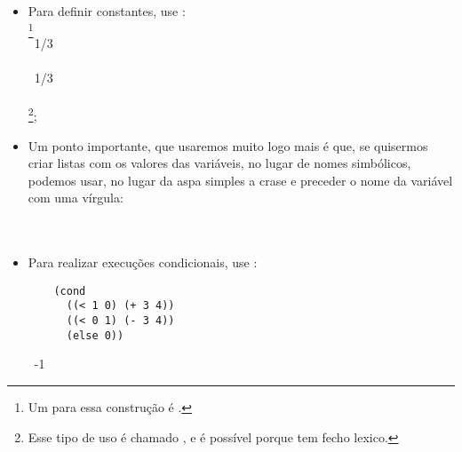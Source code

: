 \documentclass{article}
\begin{document}
\begin{itemize}
{    ter fórmulas crescendo linearmente na horizontal (note que o
    ``chapéu'' faz com que a fórmula cresça para cima'), então decidiu
    mover o chapéu para o lado, obtendo .
    Mas o chapéu flutuando parece engraçado, então Church o trocou
    pelo  o símbolo não usado mais próximo que tinha, um $\Lambda$, como em
    . Mas
    $\Lambda$ tem uma grafia muito parecida com outra letra comum, o que foi
    percebido como um incoveniente, então ele acabou eventualmente
    trocando para $\lambda$ em sua teoria, que acabou se chamando
     \cite{norvig}.}:\\
   \seta\ 1/3n

\item Para definir constantes, use :\\
  \footnote{Um
     para essa construção é
    .}\\
   \seta\ 1/3\\
  \\
   \seta\ 1/3\\
  \\
   \footnote{Esse tipo de uso é chamado
    , e é possível porque  tem
    fecho lexico.};

\item  Um ponto importante, que usaremos muito logo mais é que, se
  quisermos criar listas com os valores das variáveis, no lugar de
  nomes simbólicos, podemos usar, no lugar da aspa simples a crase e
  preceder o nome da variável com uma vírgula:\\
  \\
   \seta\ 

\item Para realizar execuções condicionais, use :\\
  \begin{lstlisting}
    (cond
      ((< 1 0) (+ 3 4))
      ((< 0 1) (- 3 4))
      (else 0))
  \end{lstlisting}
  \hspace{1cm} \seta\ -1\\
  

\end{itemize}
\end{document}
